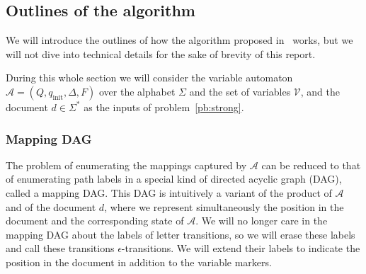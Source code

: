 \documentclass[11px]{article}
\theoremstyle{definition}
\begin{document}

    \subsection{Outlines of the algorithm}

      We will introduce the outlines of how the algorithm proposed
      in~\cite{ICDT19} works, but we will not dive into technical details for
      the sake of brevity of this report.

      During this whole section we will consider the variable automaton
      $\mathcal{A} = (Q, q_\text{init}, \Delta, F)$ over the alphabet $\Sigma$
      and the set of variables $\mathcal{V}$, and the document $d \in \Sigma^*$
      as the inputs of problem~\ref{pb:strong}.

      \subsubsection{Mapping DAG}%
        \label{sec:mapping_dag}

        The problem of enumerating the mappings captured by $\mathcal{A}$ can
        be reduced to that of enumerating path labels in a special kind of
        directed acyclic graph (DAG), called a mapping DAG. This DAG is
        intuitively a variant of the product of $\mathcal{A}$ and of the
        document $d$, where we represent simultaneously the position in the
        document and the corresponding state of $\mathcal{A}$. We will no
        longer care in the mapping DAG about the labels of letter transitions,
        so we will erase these labels and call these transitions
        $\epsilon$-transitions.  We will extend their labels to indicate the
        position in the document in addition to the variable markers.
\end{document}

